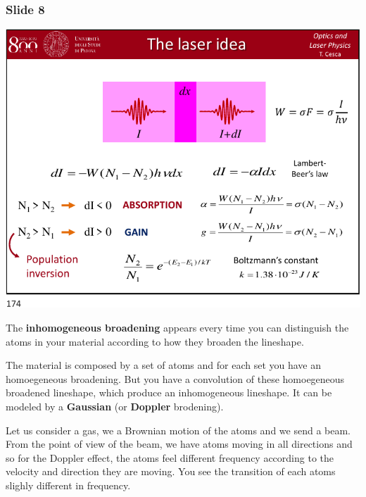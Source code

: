 \documentclass[../main/main.tex]{subfiles}
\begin{document}
\subsubsection*{Slide 8}

\begin{minipage}[]{0.5\linewidth}
\centering
\includegraphics[page=8,width=1\textwidth]{../lessons/pdf_file/09_lecture.pdf}
\end{minipage}
\hspace{0.3cm}\vspace{0.3cm}
\begin{minipage}[c]{0.47\linewidth}

The \textbf{inhomogeneous broadening} appears every time you can distinguish the atoms in your material according to how they broaden the lineshape.

The material is composed by a set of atoms and for each set you have an homoegeneous broadening. But you have a convolution of these homoegeneous broadened lineshape, which produce an inhomogeneous lineshape. It can be modeled by a \textbf{Gaussian} (or \textbf{Doppler} brodening).

Let us consider a gas, we a Brownian motion of the atoms and we send a beam. From the point of view of the beam, we have atoms moving in all directions and so for the Doppler effect, the atoms feel different frequency according to the velocity and direction they are moving. You see the transition of each atoms slighly different in frequency.

\end{minipage}
\end{document}
